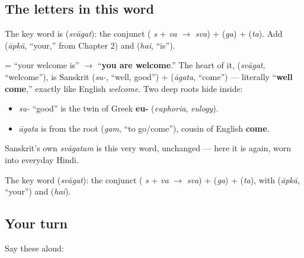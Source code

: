 \subsection*{The letters in this word}
The key word is \textbf{} (\emph{svāgat}): the conjunct \textbf{} (\textbf{} \emph{s} + \textbf{} \emph{va} $\to$ \emph{sva}) + \textbf{} (\emph{ga}) + \textbf{} (\emph{ta}). Add \textbf{} (\emph{āpkā}, \textquotedblleft{}your,\textquotedblright{} from Chapter 2) and \textbf{} (\emph{hai}, \textquotedblleft{}is\textquotedblright{}).

\begin{cousinweb}
\textbf{  } = \textquotedblleft{}your welcome is\textquotedblright{} $\to$ \textquotedblleft{}\textbf{you are welcome}.\textquotedblright{} The heart of it, \textbf{} (\emph{svāgat}, \textquotedblleft{}welcome\textquotedblright{}), is Sanskrit \textbf{} (\emph{su-}, \textquotedblleft{}well, good\textquotedblright{}) + \textbf{} (\emph{āgata}, \textquotedblleft{}come\textquotedblright{}) — literally \textquotedblleft{}\textbf{well come},\textquotedblright{} exactly like English \emph{welcome}. Two deep roots hide inside:

\begin{itemize}
\raggedright
  \item \emph{su-} \textquotedblleft{}good\textquotedblright{} is the twin of Greek \textbf{eu-} (\emph{euphoria}, \emph{eulogy}).
  \item \emph{āgata} is from the root \textbf{} (\emph{gam}, \textquotedblleft{}to go/come\textquotedblright{}), cousin of English \textbf{come}.
\end{itemize}

Sanskrit's own \emph{svāgatam} is this very word, unchanged — here it is again, worn into everyday Hindi.
\end{cousinweb}

\begin{sounds}
The key word  (\emph{svāgat}): the conjunct  ( \emph{s} +  \emph{va} $\to$ \emph{sva}) +  (\emph{ga}) +  (\emph{ta}), with  (\emph{āpkā}, “your”) and  (\emph{hai}).
\end{sounds}

\subsection*{Your turn}
Say these aloud:

